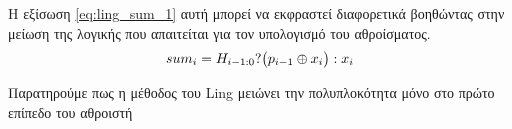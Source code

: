 Η εξίσωση \ref{eq:ling_sum_1} αυτή μπορεί να εκφραστεί διαφορετικά
βοηθώντας στην μείωση της λογικής που απαιτείται για τον υπολογισμό του αθροίσματος.
\begin{equation}
\label{eq:ling_sum_2}
\equationame{άθροισμα κατά Ling (2)}
    sum_i = H_{i-1:0} ? \big(p_{i-1} \oplus x_i\big) : x_i
\end{equation}

 Παρατηρούμε πως η μέθοδος του Ling μειώνει την πολυπλοκότητα μόνο στο πρώτο επίπεδο 
 του αθροιστή